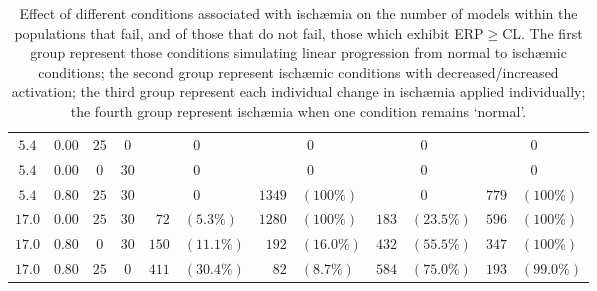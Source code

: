 \documentclass[../thesis-main.tex]{subfiles}
\begin{document}
\begin{table}
\begin{tabular}{cccc|r@{ }lr@{ }l|r@{ }lr@{ }l}
  $5.4$		& $0.00$	& $25$	& $0$	& \multicolumn{2}{c}{$0$}	& \multicolumn{2}{c|}{$0$}	& \multicolumn{2}{c}{$0$}	& \multicolumn{2}{c}{$0$}	\\
  $5.4$		& $0.00$	& $0$	& $30$	& \multicolumn{2}{c}{$0$}	& \multicolumn{2}{c|}{$0$}	& \multicolumn{2}{c}{$0$}	& \multicolumn{2}{c}{$0$}	\\
  \hline
  $5.4$		& $0.80$	& $25$	& $30$	& \multicolumn{2}{c}{$0$}	& $1349$	& $(100\%)$	& \multicolumn{2}{c}{$0$}	& $779$		& $(100\%)$	\\
  $17.0$	& $0.00$	& $25$	& $30$	& $72$		& $(5.3\%)$	& $1280$	& $(100\%)$	& $183$		& $(23.5\%)$	& $596$		& $(100\%)$	\\
  $17.0$	& $0.80$	& $0$	& $30$	& $150$		& $(11.1\%)$	& $192$		& $(16.0\%)$	& $432$		& $(55.5\%)$	& $347$		& $(100\%)$	\\
  $17.0$	& $0.80$	& $25$	& $0$	& $411$		& $(30.4\%)$	& $82$		& $(8.7\%)$	& $584$		& $(75.0\%)$	& $193$		& $(99.0\%)$	\\
 \end{tabular}
 \caption[Model failure \& ERP prolongation.]{Effect of different conditions associated with isch\ae{}mia on the number of models within the populations that fail, and of those that do not fail, those which exhibit ERP$\ge$CL. The first group represent those conditions simulating linear progression from normal to isch\ae{}mic conditions; the second group represent isch\ae{}mic conditions with decreased/increased \ikatp{} activation; the third group represent each individual change in isch\ae{}mia applied individually; the fourth group represent isch\ae{}mia when one condition remains `normal'.}
 \label{table:isch-fail_erp}
\end{table}
\end{document}
